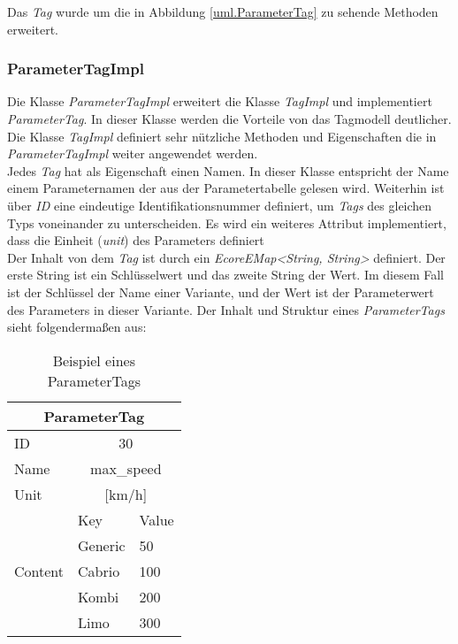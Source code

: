 Das \textit{Tag} wurde um die in Abbildung \ref{uml.ParameterTag} zu sehende Methoden erweitert. 

\subsubsection{ParameterTagImpl}
Die Klasse \textit{ParameterTagImpl} erweitert die Klasse \textit{TagImpl} und implementiert \textit{ParameterTag}. In dieser Klasse werden die Vorteile von das Tagmodell deutlicher. Die Klasse \textit{TagImpl} definiert sehr nützliche Methoden und Eigenschaften die in \textit{ParameterTagImpl} weiter angewendet werden.\\


Jedes \textit{Tag} hat als Eigenschaft einen Namen. In dieser Klasse entspricht der Name einem Parameternamen der aus der Parametertabelle gelesen wird. Weiterhin ist über \textit{ID} eine eindeutige Identifikationsnummer definiert, um \textit{Tags} des gleichen Typs voneinander zu unterscheiden. Es wird ein weiteres Attribut implementiert, dass die Einheit (\textit{unit}) des Parameters definiert\\

Der Inhalt von dem \textit{Tag} ist durch ein \textit{EcoreEMap<String, String>} definiert. Der erste String ist ein Schlüsselwert und das zweite String der Wert. Im diesem Fall ist der Schlüssel der Name einer Variante, und der Wert ist der Parameterwert des Parameters in dieser Variante. Der Inhalt und Struktur eines \textit{ParameterTags} sieht folgendermaßen aus:\\

\begin{table}[h]
\begin{center}
	\begin{tabular}{|l||ll|}
	 \hline
	 \multicolumn{3}{|c|}{ParameterTag}\\
	 \hline\hline
	 ID			& \multicolumn{2}{|c|}{30}\\
	 \hline
	 Name		& \multicolumn{2}{|c|}{max\_speed}\\
	 \hline
	 Unit		& \multicolumn{2}{|c|}{[km/h]}\\
	 \hline
	 \multirow{5}{*}{Content}	&Key			&Value\\ \cline{2-3}
	 							&Generic		&50\\
	 							&Cabrio		&100\\
	 							&Kombi		&200\\
	 							&Limo		&300\\
	 \hline
	\end{tabular}
	
	\caption{Beispiel eines ParameterTags}
	\label{table:ParameterTagStruktur}
\end{center}
\end{table}



